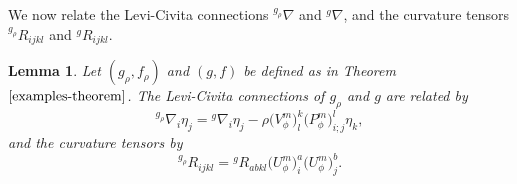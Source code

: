 \documentclass[pdftex]{sigma}
\numberwithin{equation}{section}
\newtheorem{Lemma}[Theorem]{Lemma}
\begin{document}
We now relate the Levi-Civita connections ${ }^{g_\rho} \nabla$ and ${ }^{g} \nabla$, and the curvature tensors ${ }^{g_\rho} R_{i j k l}$ and ${ }^{g} R_{i j k l}$.

\begin{Lemma}Let $(g_\rho,f_\rho)$ and $(g,f)$ be defined as in Theorem~$\ref{examples-theorem}$. The Levi-Civita connections of $g_\rho$ and $g$ are related by
\begin{equation}\label{connection-conformally-flat}
{ }^{g_\rho} \nabla_{i} \eta_{j}={ }^{g} \nabla_{i} \eta_{j}-\rho \big(V_\phi^m\big)_{l}^{k} \big(P_\phi^m\big)_{i; j}^{l} \eta_{k},
\end{equation} and the curvature tensors by
\begin{equation}\label{curvature-conformally-flat}
{ }^{g_\rho} R_{i j k l}={ }^{g} R_{a b k l} \big(U_\phi^m\big)_{i}^{a} \big(U_\phi^m\big)_{j}^{b}.
\end{equation}
\end{Lemma}
\end{document}
